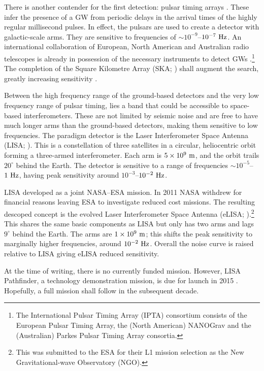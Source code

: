 There is another contender for the first detection: pulsar timing arrays \citep{McWilliams2012,Sesana2012a}. These infer the presence of a GW from periodic delays in the arrival times of the highly regular millisecond pulses. In effect, the pulsars are used to create a detector with galactic-scale arms. They are sensitive to frequencies of $\sim10^{-9}$--$10^{-7}~\mathrm{Hz}$. An international collaboration of European, North American and Australian radio telescopes is already in possession of the necessary instruments to detect GWs \citep{Hobbs2010}.\footnote{The International Pulsar Timing Array (IPTA) consortium consists of the European Pulsar Timing Array, the (North American) NANOGrav and the (Australian) Parkes Pulsar Timing Array consortia.} The completion of the Square Kilometre Array (SKA; \citealt{Dewdney2009}) shall augment the search, greatly increasing sensitivity \citep{Kramer2004}.

Between the high frequency range of the ground-based detectors and the very low frequency range of pulsar timing, lies a band that could be accessible to space-based interferometers. These are not limited by seismic noise and are free to have much longer arms than the ground-based detectors, making them sensitive to low frequencies. The paradigm detector is the Laser Interferometer Space Antenna (LISA; \citealt{Bender1998, Danzmann2003}). This is a constellation of three satellites in a circular, heliocentric orbit forming a three-armed interferometer. Each arm is $5 \times 10^9~\mathrm{m}$, and the orbit trails $20^{\circ}$ behind the Earth. The detector is sensitive to a range of frequencies $\sim10^{-5}$--$1~\mathrm{Hz}$, having peak sensitivity around $10^{-3}$--$10^{-2}~\mathrm{Hz}$.

LISA developed as a joint NASA--ESA mission. In 2011 NASA withdrew for financial reasons leaving ESA to investigate reduced cost missions. The resulting descoped concept is the evolved Laser Interferometer Space Antenna (eLISA; \citealt{Jennrich2011, Amaro-Seoane2012a}).\footnote{This was submitted to the ESA for their L1 mission selection as the New Gravitational-wave Observatory (NGO).} This shares the same basic components as LISA but only has two arms and lags $9^{\circ}$ behind the Earth. The arms are $1 \times 10^9~\mathrm{m}$; this shifts the peak sensitivity to marginally higher frequencies, around $10^{-2}~\mathrm{Hz}$. Overall the noise curve is raised relative to LISA giving eLISA reduced sensitivity.

At the time of writing, there is no currently funded mission. However, LISA Pathfinder, a technology demonstration mission, is due for launch in 2015 \citep{Anza2005, Antonucci2012}. Hopefully, a full mission shall follow in the subsequent decade.

